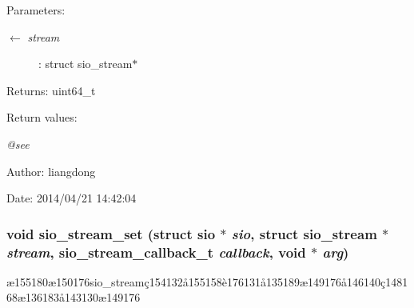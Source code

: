 \begin{Desc}
\item[Parameters:]
\begin{description}
\item[\mbox{$\leftarrow$} {\em stream}]: struct sio\_\-stream$\ast$ \end{description}
\end{Desc}
\begin{Desc}
\item[Returns:]uint64\_\-t \end{Desc}
\begin{Desc}
\item[Return values:]
\begin{description}
\item[{\em @see}]\end{description}
\end{Desc}
\begin{Desc}
\item[Author:]liangdong \end{Desc}
\begin{Desc}
\item[Date:]2014/04/21 14:42:04 \end{Desc}
\subsubsection{\setlength{\rightskip}{0pt plus 5cm}void sio\_\-stream\_\-set (struct sio $\ast$ {\em sio}, struct sio\_\-stream $\ast$ {\em stream}, sio\_\-stream\_\-callback\_\-t {\em callback}, void $\ast$ {\em arg})}\label{sio__stream_8h_a10}


\ae{}155180\ae{}150176sio\_\-stream\c{c}154132\aa{}155158\`{e}176131\aa{}135189\ae{}149176\aa{}146140\c{c}148168\ae{}136183\aa{}143130\ae{}149176 

